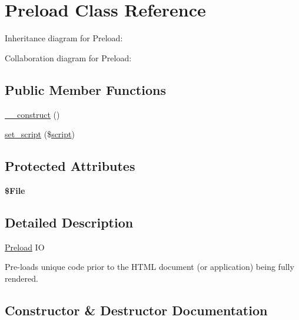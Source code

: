 \hypertarget{class_w_a_f_f_l_e_1_1_framework_1_1_i_o_1_1_preload}{}\section{Preload Class Reference}
\label{class_w_a_f_f_l_e_1_1_framework_1_1_i_o_1_1_preload}


Inheritance diagram for Preload\+:


Collaboration diagram for Preload\+:
\subsection*{Public Member Functions}
\begin{DoxyCompactItemize}
\item 
\hyperlink{class_w_a_f_f_l_e_1_1_framework_1_1_i_o_1_1_preload_a095c5d389db211932136b53f25f39685}{\+\_\+\+\_\+construct} ()
\item 
\hyperlink{class_w_a_f_f_l_e_1_1_framework_1_1_i_o_1_1_preload_aa570cf9af0fc24953f4568db3a71ae7b}{set\+\_\+script} (\$\hyperlink{class_w_a_f_f_l_e_1_1_framework_1_1_engines_1_1_h_t_m_l_a9a92856db6ac937a9dace60224dfaf65}{script})
\end{DoxyCompactItemize}
\subsection*{Protected Attributes}
\begin{DoxyCompactItemize}
\item 
\mbox{\label{class_w_a_f_f_l_e_1_1_framework_1_1_i_o_1_1_preload_a34cd105e27a4cb6632047ddfdfaa07e8}} 
{\bfseries \$\+File}
\end{DoxyCompactItemize}


\subsection{Detailed Description}
\hyperlink{class_w_a_f_f_l_e_1_1_framework_1_1_i_o_1_1_preload}{Preload} IO

Pre-\/loads unique code prior to the H\+T\+ML document (or application) being fully rendered. 

\subsection{Constructor \& Destructor Documentation}
\mbox{\label{class_w_a_f_f_l_e_1_1_framework_1_1_i_o_1_1_preload_a095c5d389db211932136b53f25f39685}} 
